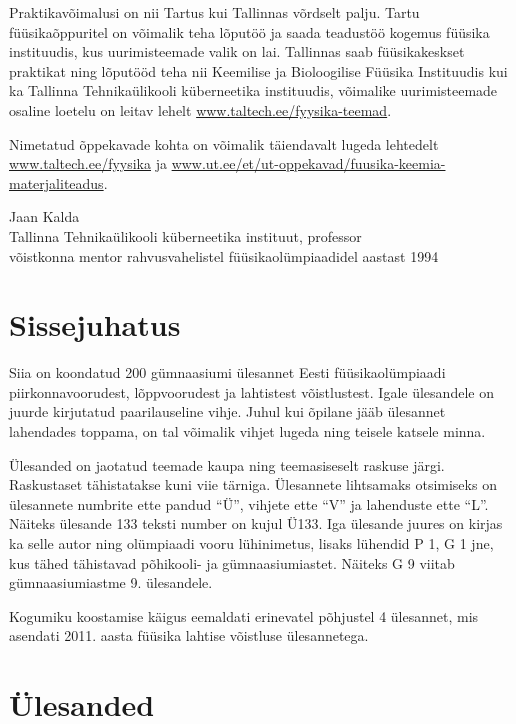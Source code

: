 \documentclass[11pt]{article}
\begin{document}
{{Praktikavõimalusi on nii Tartus kui Tallinnas võrdselt palju.
Tartu füüsikaõppuritel on võimalik teha lõputöö ja saada teadustöö kogemus füüsika instituudis, kus
uurimisteemade valik on lai.
Tallinnas saab füüsikakeskset praktikat ning lõputööd teha nii Keemilise ja Bioloogilise Füüsika Instituudis kui ka
Tallinna Tehnikaülikooli küberneetika instituudis, võimalike uurimisteemade osaline loetelu on leitav lehelt
\url{www.taltech.ee/fyysika-teemad}.

Nimetatud õppekavade kohta on võimalik täiendavalt lugeda lehtedelt
\url{www.taltech.ee/fyysika} ja
\url{www.ut.ee/et/ut-oppekavad/fuusika-keemia-materjaliteadus}.

\vspace{0.5\baselineskip}\noindent
Jaan Kalda\\
Tallinna Tehnikaülikooli küberneetika instituut, professor\\
võistkonna mentor rahvusvahelistel füüsikaolümpiaadidel aastast 1994}
\fussy

\tableofcontents
\newpage

{\setlength{\parindent}{24pt}
\section{Sissejuhatus}

Siia on koondatud 200 gümnaasiumi ülesannet Eesti füüsikaolümpiaadi piirkonnavoorudest, lõppvoorudest ja lahtistest võistlustest. Igale ülesandele on juurde kirjutatud paarilauseline vihje. Juhul kui õpilane jääb ülesannet lahendades toppama, on tal võimalik vihjet lugeda ning teisele katsele minna.

Ülesanded on jaotatud teemade kaupa ning teemasiseselt raskuse järgi. Raskustaset tähistatakse kuni viie tärniga. Ülesannete lihtsamaks otsimiseks on ülesannete numbrite ette pandud \enquote{Ü}, vihjete ette \enquote{V} ja lahenduste ette \enquote{L}. Näiteks ülesande 133 teksti number on kujul Ü133. Iga ülesande juures on kirjas ka selle autor ning olümpiaadi vooru lühinimetus, lisaks lühendid P 1, G 1 jne, kus tähed tähistavad põhikooli- ja gümnaasiumiastet. Näiteks G 9 viitab gümnaasiumiastme 9. ülesandele.

Kogumiku koostamise käigus eemaldati erinevatel põhjustel 4 ülesannet, mis asendati 2011. aasta füüsika lahtise võistluse ülesannetega.}
\newpage
\setlength{\parindent}{0pt}

        \section{Ülesanded}
        \ToggleStatement
}
\end{document}
